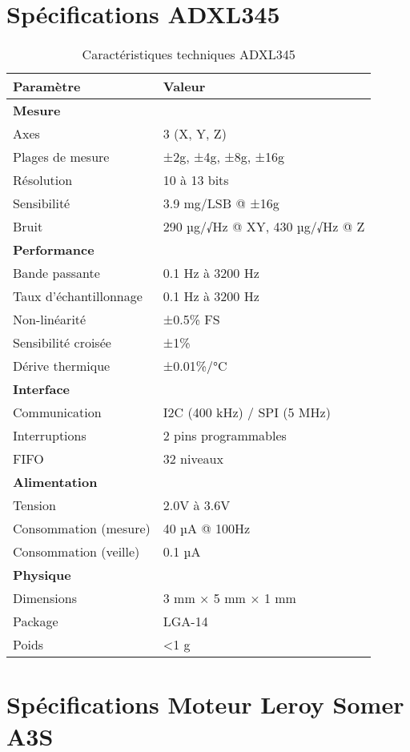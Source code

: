 \section{Spécifications ADXL345}

\begin{table}[h]
\centering
\caption{Caractéristiques techniques ADXL345}
\begin{tabular}{ll}
\toprule
\textbf{Paramètre} & \textbf{Valeur} \\
\midrule
\multicolumn{2}{l}{\textbf{Mesure}} \\
Axes & 3 (X, Y, Z) \\
Plages de mesure & ±2g, ±4g, ±8g, ±16g \\
Résolution & 10 à 13 bits \\
Sensibilité & 3.9 mg/LSB @ ±16g \\
Bruit & 290 µg/√Hz @ XY, 430 µg/√Hz @ Z \\
\midrule
\multicolumn{2}{l}{\textbf{Performance}} \\
Bande passante & 0.1 Hz à 3200 Hz \\
Taux d'échantillonnage & 0.1 Hz à 3200 Hz \\
Non-linéarité & ±0.5\% FS \\
Sensibilité croisée & ±1\% \\
Dérive thermique & ±0.01\%/°C \\
\midrule
\multicolumn{2}{l}{\textbf{Interface}} \\
Communication & I2C (400 kHz) / SPI (5 MHz) \\
Interruptions & 2 pins programmables \\
FIFO & 32 niveaux \\
\midrule
\multicolumn{2}{l}{\textbf{Alimentation}} \\
Tension & 2.0V à 3.6V \\
Consommation (mesure) & 40 µA @ 100Hz \\
Consommation (veille) & 0.1 µA \\
\midrule
\multicolumn{2}{l}{\textbf{Physique}} \\
Dimensions & 3 mm × 5 mm × 1 mm \\
Package & LGA-14 \\
Poids & <1 g \\
\bottomrule
\end{tabular}
\end{table}

\section{Spécifications Moteur Leroy Somer A3S}

